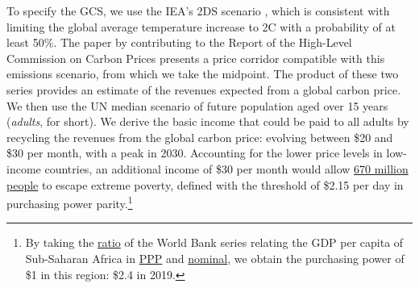 \documentclass[12pt,english]{article}
\begin{document}
To specify the GCS, we use the IEA's 2DS scenario \citep{iea_energy_2017}, which is consistent with limiting the global average temperature increase to 2\textdegree{}C with a probability of at least 50\%. The paper by \citet{hood_input_2017} contributing to the Report of the High-Level Commission on Carbon Prices \citep{stern_report_2017} presents a price corridor compatible with this emissions scenario, from which we take the midpoint. The product of these two series provides an estimate of the revenues expected from a global carbon price. We then use the UN median scenario of future population aged over 15 years (\textit{adults}, for short). We derive the basic income that could be paid to all adults by recycling the revenues from the global carbon price: evolving between \$20 and \$30 per month, with a peak in 2030. Accounting for the lower price levels in low-income countries, an additional income of \$30 per month would allow \href{https://data.worldbank.org/indicator/SI.POV.DDAY}{670 million people} to escape extreme poverty, defined with the threshold of \$2.15 per day in purchasing power parity.\footnote{By taking the \href{https://data.worldbank.org/indicator/PA.NUS.PPPC.RF}{ratio} of the World Bank series relating the GDP per capita of Sub-Saharan Africa in \href{https://data.worldbank.org/indicator/NY.GDP.PCAP.PP.KD?locations=ZG&year_high_desc=true}{PPP} and \href{https://data.worldbank.org/indicator/NY.GDP.PCAP.KD?locations=ZG&year_high_desc=true}{nominal}, we obtain the purchasing power of \$1 in this region: \$2.4 in 2019. %
} 
\end{document}

